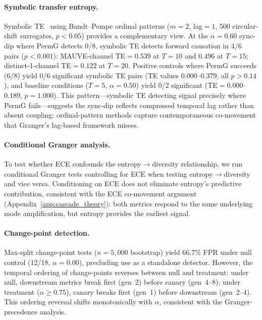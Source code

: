 \paragraph{Symbolic transfer entropy.}
Symbolic TE~\citep{staniek2008symbolic} using Bandt--Pompe ordinal patterns ($m{=}2$, lag${=}1$, 500 circular-shift surrogates, $p{<}0.05$) provides a complementary view.
At the $\alpha{=}0.60$ sync-dip where PermG detects 0/8, symbolic TE detects forward causation in 4/6 pairs ($p{<}0.001$): MAUVE-channel TE${=}0.539$ at $T{=}10$ and $0.496$ at $T{=}15$; distinct-1-channel TE${=}0.122$ at $T{=}20$.
Positive controls where PermG succeeds (6/8) yield 0/6 significant symbolic TE pairs (TE values 0.000--0.379, all $p{>}0.14$), and baseline conditions ($T{=}5$, $\alpha{=}0.50$) yield 0/2 significant (TE${=}0.000$--$0.189$, $p{=}1.000$).
This pattern---symbolic TE detecting signal precisely where PermG fails---suggests the sync-dip reflects compressed temporal lag rather than absent coupling: ordinal-pattern methods capture contemporaneous co-movement that Granger's lag-based framework misses.

\paragraph{Conditional Granger analysis.}
To test whether ECE confounds the entropy$\to$diversity relationship, we run conditional Granger tests controlling for ECE when testing entropy$\to$diversity and vice versa.
Conditioning on ECE does not eliminate entropy's predictive contribution, consistent with the ECE co-movement argument (Appendix~\ref{app:cascade_theory}): both metrics respond to the same underlying mode amplification, but entropy provides the earliest signal.

\label{app:change_point}
\paragraph{Change-point detection.}
Max-split change-point tests ($n{=}5{,}000$ bootstrap) yield 66.7\% FPR under null control (12/18, $\alpha{=}0.00$), precluding use as a standalone detector.
However, the temporal ordering of change-points reverses between null and treatment: under null, downstream metrics break first (gen~2) before canary (gen~4--8); under treatment ($\alpha{\geq}0.75$), canary breaks first (gen~1) before downstream (gen~2--4).
This ordering reversal shifts monotonically with $\alpha$, consistent with the Granger-precedence analysis.


